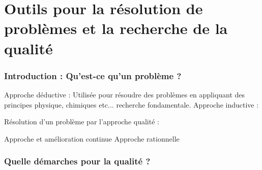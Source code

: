 ﻿\part{Outils pour la résolution de problèmes et la recherche de la qualité}

\section{Introduction : Qu’est-ce qu’un problème ?}

Approche déductive : Utilisée pour résoudre des problèmes en appliquant des principes physique, chimiques etc... recherche fondamentale.
Approche inductive :

Résolution d’un problème par l’approche qualité :

Approche et amélioration continue
Approche rationnelle

\section{Quelle démarches pour la qualité ?}

